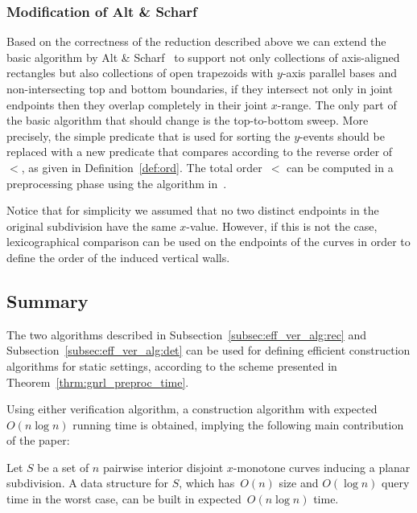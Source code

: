 \subsubsection{ Modification of Alt \& Scharf}
\label{subsubsubsec:eff_ver_alg:depth_general}

Based on the correctness of the reduction
described above we can extend the basic algorithm by Alt \& Scharf~\cite{as-cdaaa-13}
to support not only collections of axis-aligned rectangles but
also collections of open trapezoids with $y$-axis parallel bases and
non-intersecting top and bottom boundaries, if they intersect
not only in joint endpoints
then they overlap completely in their joint $x$-range.
The only part of the basic algorithm that should change
is the top-to-bottom sweep.
More precisely, the simple predicate that is used for sorting the $y$-events
should be replaced with a new predicate that
compares according to the reverse order of~$<$, as given in Definition~\ref{def:ord}.
The total order~$<$ can be computed in a preprocessing phase
using the algorithm in~\cite{OW-TSLS-83}.


Notice that for simplicity
we assumed that no two distinct endpoints
in the original subdivision have
the same $x$-value.
However, if this is not the case,
lexicographical comparison can be used on the endpoints
of the curves in order to define the order
of the induced vertical walls.


\subsection{Summary}\label{subsec:eff_ver_alg:static_bounds}

The two algorithms described in Subsection~\ref{subsec:eff_ver_alg:rec}
and Subsection~\ref{subsec:eff_ver_alg:det} can be used
for defining
efficient construction algorithms for static settings,
according to the scheme presented in Theorem~\ref{thrm:gnrl_preproc_time}.

Using either verification algorithm, a construction algorithm with expected $O(n\log {n})$ running time is obtained,
implying the following main contribution of the paper:

\begin{theorem}
\label{thrm:new}
Let $S$ be a set of $n$
pairwise interior disjoint $x$-monotone curves
inducing a planar subdivision.
A \PL data
structure for $S$, which has~$O(n)$ size and $O(\log{n})$ query time
in the worst case, can be built in expected~$O(n\log{n})$ time.
\end{theorem}









